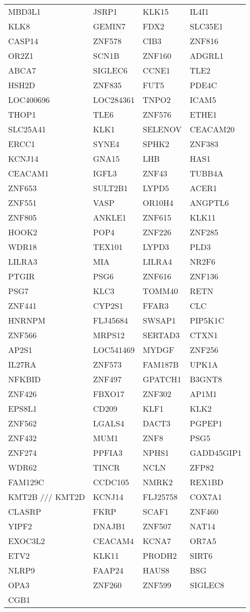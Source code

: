 {\begin{longtable}{llll}
MBD3L1&JSRP1&KLK15&IL4I1\tabularnewline
KLK8&GEMIN7&FDX2&SLC35E1\tabularnewline
CASP14&ZNF578&CIB3&ZNF816\tabularnewline
OR2Z1&SCN1B&ZNF160&ADGRL1\tabularnewline
\newpage
ABCA7&SIGLEC6&CCNE1&TLE2\tabularnewline
HSH2D&ZNF835&FUT5&PDE4C\tabularnewline
LOC400696&LOC284361&TNPO2&ICAM5\tabularnewline
THOP1&TLE6&ZNF576&ETHE1\tabularnewline
SLC25A41&KLK1&SELENOV&CEACAM20\tabularnewline
ERCC1&SYNE4&SPHK2&ZNF383\tabularnewline
KCNJ14&GNA15&LHB&HAS1\tabularnewline
CEACAM1&IGFL3&ZNF43&TUBB4A\tabularnewline
ZNF653&SULT2B1&LYPD5&ACER1\tabularnewline
ZNF551&VASP&OR10H4&ANGPTL6\tabularnewline
ZNF805&ANKLE1&ZNF615&KLK11\tabularnewline
HOOK2&POP4&ZNF226&ZNF285\tabularnewline
WDR18&TEX101&LYPD3&PLD3\tabularnewline
LILRA3&MIA&LILRA4&NR2F6\tabularnewline
PTGIR&PSG6&ZNF616&ZNF136\tabularnewline
PSG7&KLC3&TOMM40&RETN\tabularnewline
ZNF441&CYP2S1&FFAR3&CLC\tabularnewline
HNRNPM&FLJ45684&SWSAP1&PIP5K1C\tabularnewline
ZNF566&MRPS12&SERTAD3&CTXN1\tabularnewline
AP2S1&LOC541469&MYDGF&ZNF256\tabularnewline
IL27RA&ZNF573&FAM187B&UPK1A\tabularnewline
NFKBID&ZNF497&GPATCH1&B3GNT8\tabularnewline
ZNF426&FBXO17&ZNF302&AP1M1\tabularnewline
EPS8L1&CD209&KLF1&KLK2\tabularnewline
ZNF562&LGALS4&DACT3&PGPEP1\tabularnewline
ZNF432&MUM1&ZNF8&PSG5\tabularnewline
ZNF274&PPFIA3&NPHS1&GADD45GIP1\tabularnewline
WDR62&TINCR&NCLN&ZFP82\tabularnewline
FAM129C&CCDC105&NMRK2&REX1BD\tabularnewline
KMT2B /// KMT2D&KCNJ14&FLJ25758&COX7A1\tabularnewline
CLASRP&FKRP&SCAF1&ZNF460\tabularnewline
YIPF2&DNAJB1&ZNF507&NAT14\tabularnewline
EXOC3L2&CEACAM4&KCNA7&OR7A5\tabularnewline
ETV2&KLK11&PRODH2&SIRT6\tabularnewline
NLRP9&FAAP24&HAUS8&BSG\tabularnewline
OPA3&ZNF260&ZNF599&SIGLEC8\tabularnewline
CGB1&&&\tabularnewline
\bottomrule
\end{longtable}}
\addtocounter{table}{-1}
